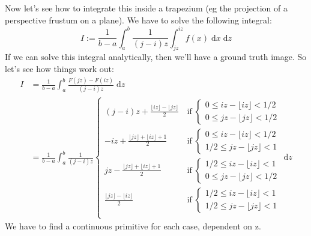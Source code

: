 \documentclass[11pt,a4paper,oneside]{report}
\begin{document}
Now let's see how to integrate this inside a trapezium (eg the projection of a 
perspective frustum on a plane).
We have to solve the following integral:
\begin{equation*}
	I := 
	\frac{1}{b-a}\int_{a}^{b} 
	\frac{1}{(j-i)z}
	\int_{jz}^{iz}
	f(x) \; \textrm{d}x \; \textrm{d}z
\end{equation*}
If we can solve this integral analytically, then we'll have a ground truth 
image. So let's see how things work out:
\begin{align*}
	I &= \frac{1}{b-a}\int_{a}^{b} 
	     \frac{F(jz) - F(iz)}{(j-i)z} \; \textrm{d}z \\
	  &= \frac{1}{b-a}\int_{a}^{b} \frac{1}{(j-i)z}
	\left\{
	\begin{array}{cccc}
	\displaystyle 
	(j-i)z + \frac{\lfloor iz  \rfloor-\lfloor jz \rfloor}{2} 
	\, & \text{if} \;
	\left\{
	\begin{array}{ll}
	0\leq iz - \lfloor iz \rfloor < 1/2 \\
	0\leq jz - \lfloor jz \rfloor < 1/2
	\end{array} \right. \\
	\displaystyle 
	-iz + \frac{\lfloor jz  \rfloor+\lfloor iz \rfloor+1}{2} 
	\, & \text{if} \;
	\left\{
	\begin{array}{cc}
	0 \leq iz - \lfloor iz \rfloor < 1/2 \\
	1/2 \leq jz - \lfloor jz \rfloor < 1
	\end{array} \right. \\
	\displaystyle 
	jz - \frac{\lfloor jz  \rfloor+\lfloor iz \rfloor+1}{2} 
	\, & \text{if} \;
	\left\{
	\begin{array}{cc}
	1/2 \leq iz - \lfloor iz \rfloor < 1 \\
	0 \leq jz - \lfloor jz \rfloor < 1/2
	\end{array} \right. \\
	\displaystyle 
	\frac{\lfloor jz \rfloor-\lfloor iz \rfloor}{2} 
	\, & \text{if} \;
	\left\{
	\begin{array}{ll}
	1/2\leq iz - \lfloor iz \rfloor < 1 \\
	1/2\leq jz - \lfloor jz \rfloor < 1
	\end{array} \right. \\
	\end{array} \right. \! \textrm{d}z
\end{align*}
We have to find a continuous primitive for each case, dependent on z.
\end{document}
